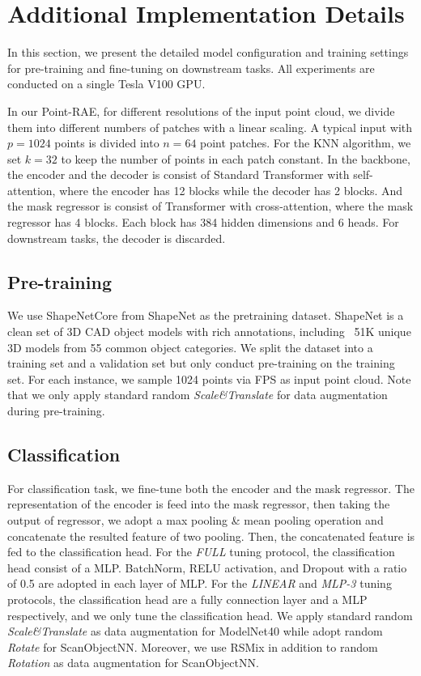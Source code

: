 \documentclass[sigconf, screen]{acmart}
\begin{document}
\section{Additional Implementation Details}

In this section, we present the detailed model configuration and training settings for pre-training and fine-tuning on downstream tasks. All experiments are conducted on a single Tesla V100 GPU.

In our Point-RAE, for different resolutions of the input point cloud, we divide them into different numbers of patches with a linear scaling.
A typical input with $p=1024$ points is divided into $n=64$ point patches.
For the KNN algorithm, we set $k=32$ to keep the number of points in each patch constant.
In the backbone, the encoder and the decoder is consist of Standard Transformer with self-attention, where the encoder has 12 blocks while the decoder has 2 blocks.
And the mask regressor is consist of Transformer with cross-attention, where the mask regressor has 4 blocks.
Each block has 384 hidden dimensions and 6 heads. 
For downstream tasks, the decoder is discarded.



\subsection{Pre-training}
We use ShapeNetCore from ShapeNet \cite{chang2015shapenet} as the pretraining dataset. 
ShapeNet is a clean set of 3D CAD object models with rich annotations, including ~51K unique 3D models from 55 common object categories.
We split the dataset into a training set and a validation set but only conduct pre-training on the training set. For each instance, we sample 1024 points via FPS as input point cloud. Note that we only apply standard random \textit{Scale\&Translate} for data augmentation during pre-training.


\subsection{Classification}
For classification task, we fine-tune both the encoder and the mask regressor.
The representation of the encoder is feed into the mask regressor, then taking the output of regressor, we adopt a max pooling \& mean pooling operation and concatenate the resulted feature of two pooling.
Then, the concatenated feature is fed to the classification head.
For the \textit{FULL} tuning protocol, the classification head consist of a MLP. BatchNorm, RELU activation, and Dropout with a ratio of 0.5 are adopted in each layer of MLP.
For the \textit{LINEAR} and \textit{MLP-3} tuning protocols, the classification head are a fully connection layer and a MLP respectively, and we only tune the classification head.
We apply standard random \textit{Scale\&Translate} as data augmentation for ModelNet40 while adopt random \textit{Rotate} for ScanObjectNN.
Moreover, we use RSMix \cite{lee2021regularization} in addition to random \textit{Rotation} as data augmentation for ScanObjectNN.
\end{document}
